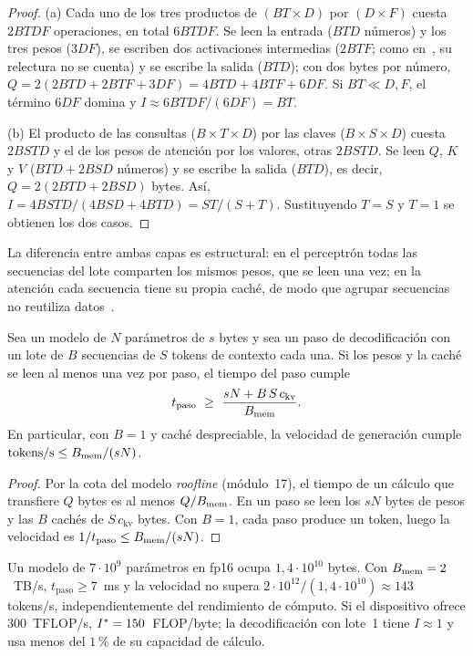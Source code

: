 \begin{proof}
(a) Cada uno de los tres productos de $(BT\times D)$ por $(D\times F)$ cuesta $2BTDF$ operaciones, en total $6BTDF$. Se leen la entrada ($BTD$ números) y los tres pesos ($3DF$), se escriben dos activaciones intermedias ($2BTF$; como en~\cite{cs336}, su relectura no se cuenta) y se escribe la salida ($BTD$); con dos bytes por número, $Q=2(2BTD+2BTF+3DF)=4BTD+4BTF+6DF$. Si $BT\ll D,F$, el término $6DF$ domina y $I\approx 6BTDF/(6DF)=BT$.

(b) El producto de las consultas ($B\times T\times D$) por las claves ($B\times S\times D$) cuesta $2BSTD$ y el de los pesos de atención por los valores, otras $2BSTD$. Se leen $Q$, $K$ y $V$ ($BTD+2BSD$ números) y se escribe la salida ($BTD$), es decir, $Q=2(2BTD+2BSD)$ bytes. Así, $I=4BSTD/(4BSD+4BTD)=ST/(S+T)$. Sustituyendo $T=S$ y $T=1$ se obtienen los dos casos.
\end{proof}

La diferencia entre ambas capas es estructural: en el perceptrón todas las secuencias del lote comparten los mismos pesos, que se leen una vez; en la atención cada secuencia tiene su propia caché, de modo que agrupar secuencias no reutiliza datos~\cite{cs336}.

\begin{teorema}\label{teo:cota-memoria}
Sea un modelo de $N$ parámetros de $s$ bytes y sea un paso de decodificación con un lote de $B$ secuencias de $S$ tokens de contexto cada una. Si los pesos y la caché se leen al menos una vez por paso, el tiempo del paso cumple
\[
t_{\mathrm{paso}}\ \ge\ \frac{sN+B\,S\,c_{\mathrm{kv}}}{\Bmem}.
\]
En particular, con $B=1$ y caché despreciable, la velocidad de generación cumple $\text{tokens/s}\le B_{\mathrm{mem}}/(sN)$.
\end{teorema}

\begin{proof}
Por la cota del modelo \emph{roofline} (módulo~17), el tiempo de un cálculo que transfiere $Q$ bytes es al menos $Q/B_{\mathrm{mem}}$. En un paso se leen los $sN$ bytes de pesos y las $B$ cachés de $S\,c_{\mathrm{kv}}$ bytes. Con $B=1$, cada paso produce un token, luego la velocidad es $1/t_{\mathrm{paso}}\le B_{\mathrm{mem}}/(sN)$.
\end{proof}

\begin{ejemplo}\label{ej:cota}
Un modelo de $7\cdot 10^{9}$ parámetros en fp16 ocupa $1{,}4\cdot 10^{10}$ bytes. Con $B_{\mathrm{mem}}=2$~TB/s, $t_{\mathrm{paso}}\ge 7$~ms y la velocidad no supera $2\cdot 10^{12}/(1{,}4\cdot 10^{10})\approx 143$ tokens/s, independientemente del rendimiento de cómputo. Si el dispositivo ofrece $300$~TFLOP/s, $I^{\ast}=150$~FLOP/byte; la decodificación con lote~1 tiene $I\approx 1$ y usa menos del $1\,\%$ de su capacidad de cálculo.
\end{ejemplo}

